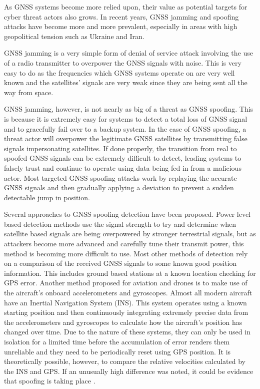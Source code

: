 \documentclass[conference]{IEEEtran}
\begin{document}
As GNSS systems become more relied upon, their value as potential targets for cyber threat actors also grows.  In recent years, GNSS jamming and spoofing attacks have become more and more prevalent, especially in areas with high geopolitical tension such as Ukraine and Iran.

GNSS jamming is a very simple form of denial of service attack involving the use of a radio transmitter to overpower the GNSS signals with noise.  This is very easy to do as the frequencies which GNSS systems operate on are very well known and the satellites’ signals are very weak since they are being sent all the way from space.

GNSS jamming, however, is not nearly as big of a threat as GNSS spoofing.  This is because it is extremely easy for systems to detect a total loss of GNSS signal and to gracefully fail over to a backup system.  In the case of GNSS spoofing, a threat actor will overpower the legitimate GNSS satellites by transmitting false signals impersonating satellites.  If done properly, the transition from real to spoofed GNSS signals can be extremely difficult to detect, leading systems to falsely trust and continue to operate using data being fed in from a malicious actor.  Most targeted GNSS spoofing attacks work by replaying the accurate GNSS signals and then gradually applying a deviation to prevent a sudden detectable jump in position.

Several approaches to GNSS spoofing detection have been proposed.  Power level based detection methods use the signal strength to try and determine when satellite based signals are being overpowered by stronger terrestrial signals, but as attackers become more advanced and carefully tune their transmit power, this method is becoming more difficult to use.  Most other methods of detection rely on a comparison of the received GNSS signals to some known good position information.  This includes ground based stations at a known location checking for GPS error.  Another method proposed for aviation and drones is to make use of the aircraft’s onboard accelerometers and gyroscopes.  Almost all modern aircraft have an Inertial Navigation System (INS).  This system operates using a known starting position and then continuously integrating extremely precise data from the accelerometers and gyroscopes to calculate how the aircraft’s position has changed over time.  Due to the nature of these systems, they can only be used in isolation for a limited time before the accumulation of error renders them unreliable and they need to be periodically reset using GPS position.  It is theoretically possible, however, to compare the relative velocities calculated by the INS and GPS.  If an unusually high difference was noted, it could be evidence that spoofing is taking place \cite{meng2021}.
\end{document}
